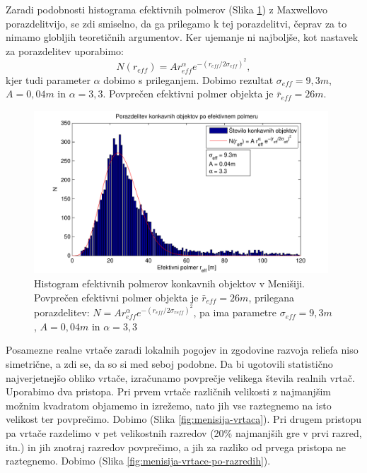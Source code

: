 \documentclass[a4paper, twoside, 12pt]{book}
\begin{document}
Zaradi podobnosti histograma efektivnih polmerov (Slika \ref{fig:menisija-polmeri-hist}) z Maxwellovo porazdelitvijo, se zdi smiselno, da ga prilegamo k tej porazdelitvi, čeprav za to nimamo globljih teoretičnih argumentov. Ker ujemanje ni najboljše, kot nastavek za porazdelitev uporabimo:
\begin{equation} 
  N(r_{eff}) = A r_{eff}^{\alpha} e^{-(r_{eff}/ 2 \sigma_{eff})^2},
\end{equation}
kjer tudi parameter $\alpha$ dobimo s prileganjem. Dobimo rezultat $\sigma_{eff}=9,3m$, $A=0,04m$ in $\alpha=3,3$. Povprečen efektivni polmer objekta je $\bar r_{eff}=26m$.

  \begin{figure}[h!]
    \begin{center}
      \includegraphics[width=11cm]{slike/menisija-polmeri-hist-maxwell}
    \end{center}
    \caption{Histogram efektivnih polmerov konkavnih objektov v Menišiji. Povprečen efektivni polmer objekta je $\bar r_{eff}=26m$, prilegana porazdelitev: $ N = A r_{eff}^{\alpha} e^{-(r_{eff}/2 \sigma_{reff})^2}$, pa ima parametre $\sigma_{eff}=9,3m$, $A=0,04m$ in $\alpha=3,3$}
    \label{fig:menisija-polmeri-hist}
  \end{figure}

  Posamezne realne vrtače zaradi lokalnih pogojev in zgodovine razvoja reliefa niso simetrične, a zdi se, da so si med seboj podobne. Da bi ugotovili statistično najverjetnejšo obliko vrtače, izračunamo povprečje velikega števila realnih vrtač. Uporabimo dva pristopa. Pri prvem vrtače različnih velikosti z najmanjšim možnim kvadratom objamemo in izrežemo, nato jih vse raztegnemo na isto velikost ter povprečimo. Dobimo (Slika \ref{fig:menisija-vrtaca}). Pri drugem pristopu pa vrtače razdelimo v pet velikostnih razredov (20\% najmanjših gre v prvi razred, itn.) in jih znotraj razredov povprečimo, a jih za razliko od prvega pristopa ne raztegnemo. Dobimo (Slika \ref{fig:menisija-vrtace-po-razredih}).
\end{document}
